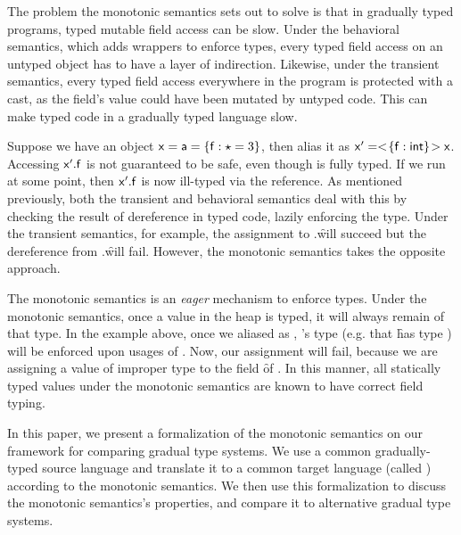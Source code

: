\documentclass[sigconf]{acmart}
\begin{document}
The problem the monotonic semantics sets out to solve is that in gradually
typed programs, typed mutable field access can be slow. Under the behavioral
semantics, which adds wrappers to enforce types, every typed field access on
an untyped object has to have a layer of indirection. Likewise, under the
transient semantics, every typed field access everywhere in the program is
protected with a cast, as the field's value could have been mutated by untyped
code. This can make typed code in a gradually typed language slow.

Suppose we have an object $\x = \a = \{ \f:\any = 3 \}$, then alias it as
$\xp = \SubCast{\{ \f:\xt{int} \}}\x$. Accessing $\xp.\f$ is not guaranteed
to be safe, even though \xp is fully typed. If we run  at
some point, then $\xp.\f$ is now ill-typed via the  reference. As mentioned
previously, both the transient and behavioral semantics deal with this by
checking the result of dereference in typed code, lazily enforcing the type.
Under the transient semantics, for example, the assignment to \x.\f will
succeed but the dereference from \xp.\f will fail. However, the monotonic
semantics takes the opposite approach.

The monotonic semantics is an \emph{eager} mechanism to enforce types. Under
the monotonic semantics, once a value in the heap is typed, it will always
remain of that type. In the example above, once we aliased \x as \xp, \xp's
type (e.g. that \f has type ) will be enforced upon usages of \x. Now,
our assignment  will fail, because we are assigning a
value of improper type to the field \f of \a. In this manner, all statically
typed values under the monotonic semantics are known to have correct field
typing.

In this paper, we present a formalization of the monotonic semantics on our
framework for comparing gradual type systems. We use a common gradually-typed
source language and translate it to a common target language (called \kafka)
according to the monotonic semantics. We then use this formalization to
discuss the monotonic semantics's properties, and compare it to alternative
gradual type systems.
\end{document}

